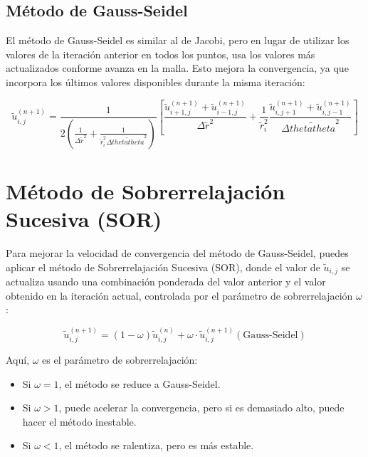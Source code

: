 \subsection{Método de Gauss-Seidel}

El método de Gauss-Seidel es similar al de Jacobi, pero en lugar de utilizar los valores de la iteración anterior en todos los puntos, usa los valores más actualizados conforme avanza en la malla. Esto mejora la convergencia, ya que incorpora los últimos valores disponibles durante la misma iteración:

\begin{equation}
    \tilde{u}_{i,j}^{(n+1)} = \frac{1}{2 \left(\frac{1}{\Delta \tilde{r}^2} + \frac{1}{\tilde{r}_i^2 \Delta \tilde{thetatheta}^2}\right)} 
    \left[ \frac{\tilde{u}_{i+1,j}^{(n+1)} + \tilde{u}_{i-1,j}^{(n+1)}}{\Delta \tilde{r}^2} 
    + \frac{1}{\tilde{r}_i^2} \frac{\tilde{u}_{i,j+1}^{(n+1)} + \tilde{u}_{i,j-1}^{(n+1)}}{\Delta \tilde{thetatheta}^2} \right]
\end{equation}

\section{Método de Sobrerrelajación Sucesiva (SOR)}

Para mejorar la velocidad de convergencia del método de Gauss-Seidel, puedes aplicar el método de Sobrerrelajación Sucesiva (SOR), donde el valor de \( \tilde{u}_{i,j} \) se actualiza usando una combinación ponderada del valor anterior y el valor obtenido en la iteración actual, controlada por el parámetro de sobrerrelajación \( \omega \):

\begin{equation}
    \tilde{u}_{i,j}^{(n+1)} = (1 - \omega) \tilde{u}_{i,j}^{(n)} + \omega \cdot \tilde{u}_{i,j}^{(n+1)}(\text{Gauss-Seidel})
\end{equation}

Aquí, \( \omega \) es el parámetro de sobrerrelajación:

\begin{itemize}
    \item Si \( \omega = 1 \), el método se reduce a Gauss-Seidel.
    \item Si \( \omega > 1 \), puede acelerar la convergencia, pero si es demasiado alto, puede hacer el método inestable.
    \item Si \( \omega < 1 \), el método se ralentiza, pero es más estable.
\end{itemize}


